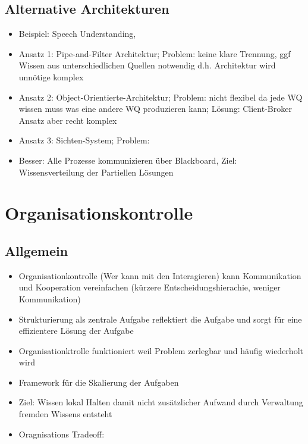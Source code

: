 \documentclass{article} %
\begin{document}
	\subsection{Alternative Architekturen}
	\begin{itemize}
		\item Beispiel: Speech Understanding,
		\item Ansatz 1: Pipe-and-Filter Architektur; Problem: keine klare Trennung, ggf Wissen aus unterschiedlichen Quellen notwendig d.h. Architektur wird unnötige komplex
		\item Ansatz 2: Object-Orientierte-Architektur; Problem: nicht flexibel da jede WQ wissen muss was eine andere WQ produzieren kann; Lösung: Client-Broker Ansatz aber recht komplex
		\item Ansatz 3: Sichten-System; Problem: 
		\item Besser: Alle Prozesse kommunizieren über Blackboard, Ziel: Wissensverteilung der Partiellen Lösungen
	\end{itemize}
	\section{Organisationskontrolle}
	\subsection{Allgemein}
	\begin{itemize}
		\item Organisationkontrolle (Wer kann mit den Interagieren) kann Kommunikation und Kooperation vereinfachen (kürzere Entscheidungshierachie, weniger Kommunikation)
		\item Strukturierung als zentrale Aufgabe reflektiert die Aufgabe und sorgt für eine effizientere Lösung der Aufgabe
		\item Organisationktrolle funktioniert weil Problem zerlegbar und häufig wiederholt wird
		\item Framework für die Skalierung der Aufgaben
		\item Ziel: Wissen lokal Halten damit nicht zusätzlicher Aufwand durch Verwaltung fremden Wissens entsteht
		\item Oragnisations Tradeoff: 
	\end{itemize}
\end{document}
